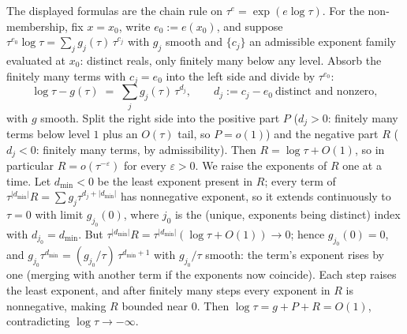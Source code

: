 The displayed formulas are the chain rule on $\tau^e = \exp(e\log\tau)$. For the non-membership, fix $x = x_0$, write $e_0 := e(x_0)$, and suppose $\tau^{e_0}\log\tau = \sum_j g_j(\tau)\,\tau^{c_j}$ with $g_j$ smooth and $\{c_j\}$ an admissible exponent family evaluated at $x_0$: distinct reals, only finitely many below any level. Absorb the finitely many terms with $c_j = e_0$ into the left side and divide by $\tau^{e_0}$:
\[
\log\tau - g(\tau) \;=\; \sum_j g_j(\tau)\,\tau^{d_j}, \qquad d_j := c_j - e_0 \ \text{distinct and nonzero},
\]
with $g$ smooth. Split the right side into the positive part $P$ ($d_j > 0$: finitely many terms below level $1$ plus an $O(\tau)$ tail, so $P = o(1)$) and the negative part $R$ ($d_j < 0$: finitely many terms, by admissibility). Then $R = \log\tau + O(1)$, so in particular $R = o(\tau^{-\varepsilon})$ for every $\varepsilon > 0$. We raise the exponents of $R$ one at a time. Let $d_{\min} < 0$ be the least exponent present in $R$; every term of $\tau^{|d_{\min}|} R = \sum g_j \tau^{d_j + |d_{\min}|}$ has nonnegative exponent, so it extends continuously to $\tau = 0$ with limit $g_{j_0}(0)$, where $j_0$ is the (unique, exponents being distinct) index with $d_{j_0} = d_{\min}$. But $\tau^{|d_{\min}|} R = \tau^{|d_{\min}|}(\log\tau + O(1)) \to 0$; hence $g_{j_0}(0) = 0$, and $g_{j_0} \tau^{d_{\min}} = (g_{j_0}/\tau)\,\tau^{d_{\min}+1}$ with $g_{j_0}/\tau$ smooth: the term's exponent rises by one (merging with another term if the exponents now coincide). Each step raises the least exponent, and after finitely many steps every exponent in $R$ is nonnegative, making $R$ bounded near $0$. Then $\log\tau = g + P + R = O(1)$, contradicting $\log\tau \to -\infty$.
